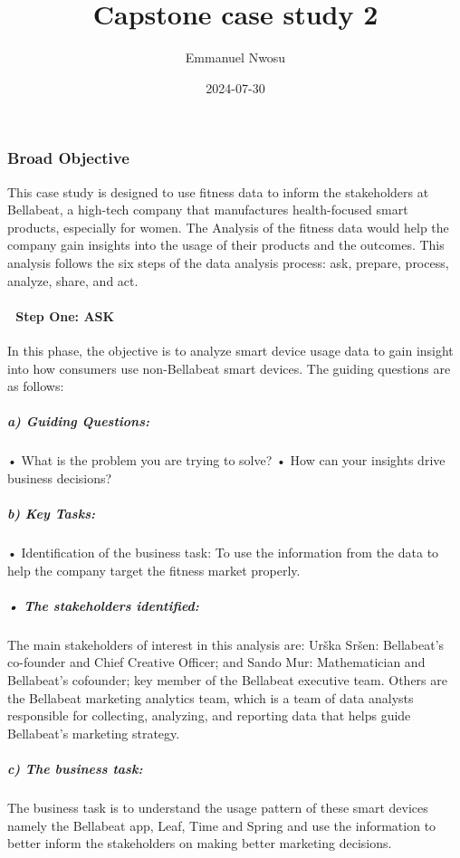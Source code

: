 \documentclass[
]{article}
\title{Capstone case study 2}
\author{Emmanuel Nwosu}
\date{2024-07-30}
\begin{document}
\maketitle

\subsubsection{Broad Objective}\label{broad-objective}

This case study is designed to use fitness data to inform the
stakeholders at Bellabeat, a high-tech company that manufactures
health-focused smart products, especially for women. The Analysis of the
fitness data would help the company gain insights into the usage of
their products and the outcomes. This analysis follows the six steps of
the data analysis process: ask, prepare, process, analyze, share, and
act.

\paragraph{ Step One: ASK}\label{step-one-ask}

In this phase, the objective is to analyze smart device usage data to
gain insight into how consumers use non-Bellabeat smart devices. The
guiding questions are as follows:

\subparagraph{a) Guiding Questions:}\label{a-guiding-questions}

• What is the problem you are trying to solve? • How can your insights
drive business decisions?

\subparagraph{b) Key Tasks:}\label{b-key-tasks}

• Identification of the business task: To use the information from the
data to help the company target the fitness market properly.

\subparagraph{• The stakeholders
identified:}\label{the-stakeholders-identified}

The main stakeholders of interest in this analysis are: Urška Sršen:
Bellabeat's co-founder and Chief Creative Officer; and Sando Mur:
Mathematician and Bellabeat's cofounder; key member of the Bellabeat
executive team. Others are the Bellabeat marketing analytics team, which
is a team of data analysts responsible for collecting, analyzing, and
reporting data that helps guide Bellabeat's marketing strategy.

\subparagraph{c) The business task:}\label{c-the-business-task}

The business task is to understand the usage pattern of these smart
devices namely the Bellabeat app, Leaf, Time and Spring and use the
information to better inform the stakeholders on making better marketing
decisions.
\end{document}
